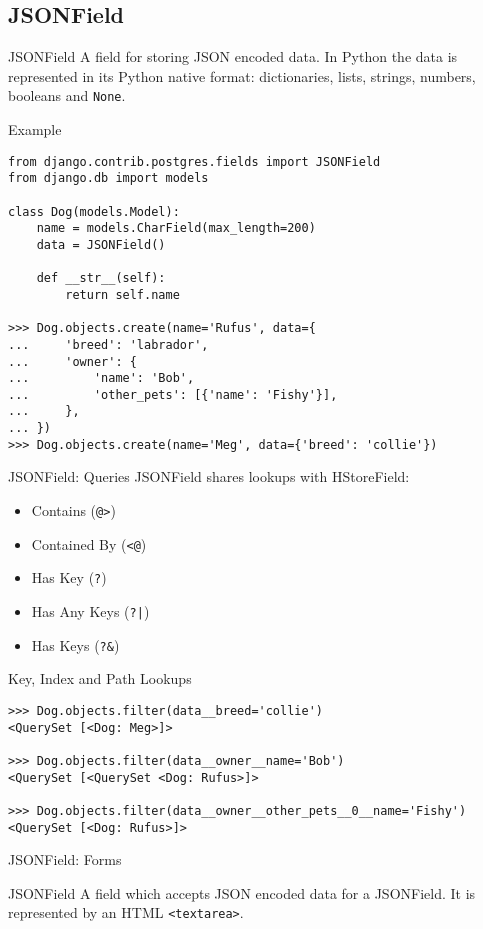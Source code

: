 \subsection{JSONField}
\begin{frame}[fragile]{JSONField}
    A field for storing JSON encoded data. In Python the data is represented in its Python native format: dictionaries, lists, strings, numbers, booleans and \texttt{None}.

    \begin{block}{Example}
        \begin{verbatim}
from django.contrib.postgres.fields import JSONField
from django.db import models

class Dog(models.Model):
    name = models.CharField(max_length=200)
    data = JSONField()

    def __str__(self):
        return self.name

>>> Dog.objects.create(name='Rufus', data={
...     'breed': 'labrador',
...     'owner': {
...         'name': 'Bob',
...         'other_pets': [{'name': 'Fishy'}],
...     },
... })
>>> Dog.objects.create(name='Meg', data={'breed': 'collie'})
        \end{verbatim}
    \end{block}

\end{frame}
\begin{frame}[fragile]{JSONField: Queries}
    JSONField shares lookups with HStoreField:
    \begin{itemize}
        \item Contains (\texttt{@}\texttt{>})
        \item Contained By (\texttt{<}\texttt{@})
        \item Has Key (\texttt{?})
        \item Has Any Keys (\texttt{?}\texttt{|})
        \item Has Keys (\texttt{?}\texttt{\&})
    \end{itemize}

    \begin{block}{Key, Index and Path Lookups}
        \begin{verbatim}
>>> Dog.objects.filter(data__breed='collie')
<QuerySet [<Dog: Meg>]>

>>> Dog.objects.filter(data__owner__name='Bob')
<QuerySet [<QuerySet <Dog: Rufus>]>

>>> Dog.objects.filter(data__owner__other_pets__0__name='Fishy')
<QuerySet [<Dog: Rufus>]>
        \end{verbatim}
    \end{block}
\end{frame}
\begin{frame}[fragile]{JSONField: Forms}
    \begin{block}{JSONField}
        A field which accepts JSON encoded data for a JSONField. It is represented by an HTML \texttt{<textarea>}.
    \end{block}
\end{frame}
